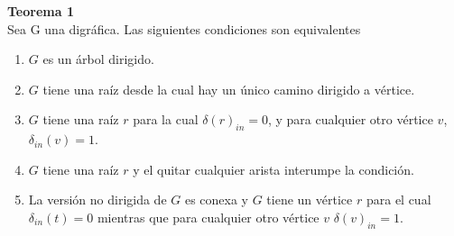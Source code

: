 \documentclass[12pt,a4paper]{report}
\begin{document}
\begin{enumerate}
{		\textbf{Teorema 1}\\
		Sea G una digráfica. Las siguientes condiciones son equivalentes
		\begin{enumerate} [label = \alph*)]
			\item {
				$G$ es un árbol dirigido.\\
			}
			\item {
				$G$ tiene una raíz desde la cual hay un único camino dirigido a
				vértice.\\
			}

			\item{
				$G$ tiene una raíz $r$ para la cual $\delta(r)_{in} = 0$, y para cualquier
				otro vértice $v$, $\delta_{in}(v) = 1$.\\
			}

			\item{
				$G$ tiene una raíz $r$ y el quitar cualquier arista interumpe la
				condición.
			}
			\item{
				La versión no dirigida de $G$ es conexa y $G$ tiene un vértice $r$ para
				el cual $\delta_{in}(t) = 0$ mientras que para cualquier otro vértice
				$v$ $\delta(v)_{in} = 1$.
			}
		\end{enumerate}
	}

\end{enumerate}
\end{document}
